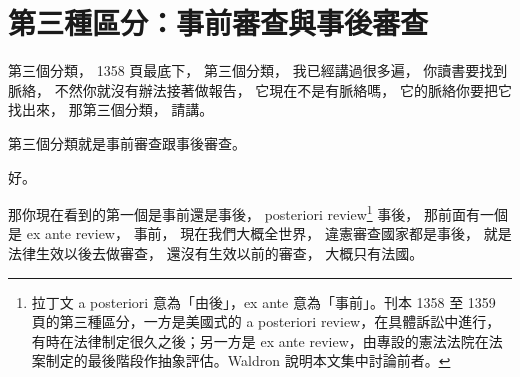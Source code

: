 \section{第三種區分：事前審查與事後審查}

\hypertarget{w06:cue:1101}{}第三個分類，
\hypertarget{w06:cue:1102}{}1358 頁最底下，
\hypertarget{w06:cue:1103}{}第三個分類，
\hypertarget{w06:cue:1104}{}我已經講過很多遍，
\hypertarget{w06:cue:1105}{}你讀書要找到脈絡，
\hypertarget{w06:cue:1106}{}不然你就沒有辦法接著做報告，
\hypertarget{w06:cue:1107}{}它現在不是有脈絡嗎，
\hypertarget{w06:cue:1108}{}它的脈絡你要把它找出來，
\hypertarget{w06:cue:1109}{}那第三個分類，
\hypertarget{w06:cue:1110}{}請講。

\hypertarget{w06:cue:1111}{}第三個分類就是事前審查跟事後審查。

\hypertarget{w06:cue:1112}{}好。

\hypertarget{w06:cue:1113}{}那你現在看到的第一個是事前還是事後，
\hypertarget{w06:cue:1114}{}posteriori review\footnote{拉丁文 a posteriori 意為「由後」，ex ante 意為「事前」。刊本 1358 至 1359 頁的第三種區分，一方是美國式的 a posteriori review，在具體訴訟中進行，有時在法律制定很久之後；另一方是 ex ante review，由專設的憲法法院在法案制定的最後階段作抽象評估。Waldron 說明本文集中討論前者。}
\hypertarget{w06:cue:1115}{}事後，
\hypertarget{w06:cue:1116}{}那前面有一個是 ex ante review，
\hypertarget{w06:cue:1117}{}事前，
\hypertarget{w06:cue:1118}{}現在我們大概全世界，
\hypertarget{w06:cue:1119}{}違憲審查國家都是事後，
\hypertarget{w06:cue:1120}{}就是法律生效以後去做審查，
\hypertarget{w06:cue:1121}{}還沒有生效以前的審查，
\hypertarget{w06:cue:1122}{}大概只有法國。

